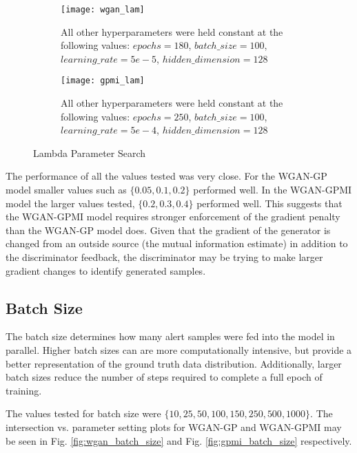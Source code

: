 \begin{figure}[!htbp]
	\centering
	
	\begin{subfigure}{.7\textwidth}
		\texttt{[image: wgan\_lam]}
	\end{subfigure}%
	\begin{subfigure}{.3\textwidth}
		\caption{
			All other hyperparameters were held constant at the following values: $epochs=180$, $batch\_size = 100$, $learning\_rate=5e-5$, $hidden\_dimension=128$
		}
		\label{fig:wgan_lam}
	\end{subfigure}%
	
	\begin{subfigure}{.7\textwidth}
		\texttt{[image: gpmi\_lam]}
	\end{subfigure}%
	\begin{subfigure}{.3\textwidth}
		\caption{
			All other hyperparameters were held constant at the following values: $epochs=250$, $batch\_size=100$, $learning\_rate=5e-4$, $hidden\_dimension=128$
		}
		\label{fig:gpmi_lam}
	\end{subfigure}%
	\caption{Lambda Parameter Search}
\end{figure}

The performance of all the values tested was very close. For the WGAN-GP model smaller values such as $\{0.05, 0.1, 0.2\}$ performed well. In the WGAN-GPMI model the larger values tested, $\{0.2,0.3,0.4\}$ performed well. This suggests that the WGAN-GPMI model requires stronger enforcement of the gradient penalty than the WGAN-GP model does. Given that the gradient of the generator is changed from an outside source (the mutual information estimate) in addition to the discriminator feedback, the discriminator may be trying to make larger gradient changes to identify generated samples. 


\subsection{Batch Size}
\label{sec:bs}

The batch size determines how many alert samples were fed into the model in parallel. Higher batch sizes can are more computationally intensive, but provide a better representation of the ground truth data distribution. Additionally, larger batch sizes reduce the number of steps required to complete a full epoch of training. 

The values tested for batch size were $\{10, 25, 50, 100, 150, 250, 500, 1000\}$. The intersection vs. parameter setting plots for WGAN-GP and WGAN-GPMI may be seen in Fig. \ref{fig:wgan_batch_size} and Fig. \ref{fig:gpmi_batch_size} respectively.

